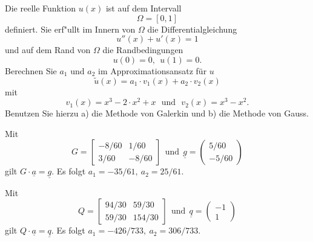 Die reelle Funktion $u(x)$ ist auf dem Intervall
\[
\Omega = [0, 1]
\]
definiert. Sie erf"ullt im Innern von $\Omega$ die Differentialgleichung
\[
u''(x) + u'(x) = 1
\]
und auf dem Rand von $\Omega$ die Randbedingungen
\[
u(0) = 0, \ \ u(1) = 0.
\]
Berechnen Sie $a_1$ und $a_2$ im Approximationsansatz f\"ur $u$
\[
\tilde u(x) = a_1 \cdot v_1(x) + a_2 \cdot v_2(x)
\]
mit
\[
v_1(x) = x^3 - 2 \cdot x^2 + x \ \ \ \text{und} \ \ \  v_2(x) = x^3 - x^2.
\]
Benutzen Sie hierzu  a) die Methode von Galerkin und b) die Methode von Gauss.

\begin{loesung}
\begin{teilaufgaben}
\item
Mit 
\[
G = \left[\begin{array}{rr} -8/60 & 1/60 \\ 3/60 & -8/60  \end{array}\right] \ \ \text{und} \ \
  \underline{g} =  \left(\begin{array}{r} 5/60  \\ - 5/60 \end{array}\right)
\]
gilt $G \cdot \underline{a} = \underline{g}.$ Es folgt $a_1 = -35/61, \ a_2 = 25/61$.

\item
Mit
\[
Q = \left[\begin{array}{rr} 94/30 & 59/30 \\ 59/30 & 154/30  \end{array}\right] \ \ \text{und} \ \
  \underline{q} =  \left(\begin{array}{r} -1  \\ 1 \end{array}\right)
\]
gilt $Q \cdot \underline{a} = \underline{q}$.
Es folgt $a_1 = -426/733, \ a_2 = 306/733$.
\end{teilaufgaben}
\end{loesung}

